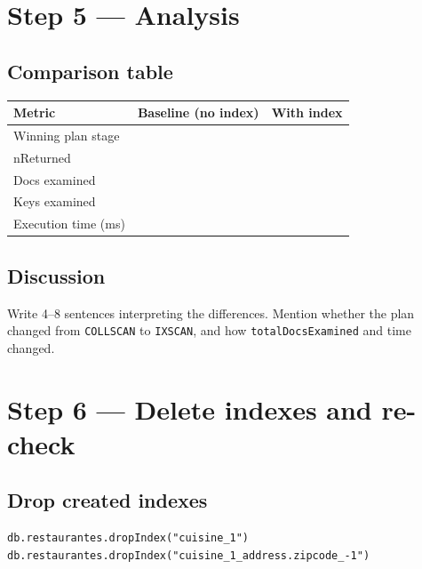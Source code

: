 \documentclass[11pt]{article}
\begin{document}
\section{Step 5 — Analysis}
\subsection{Comparison table}
\begin{tcolorbox}
\begin{tabular}{p{4.2cm}p{5.0cm}p{5.0cm}}
\textbf{Metric} & \textbf{Baseline (no index)} & \textbf{With index} \\
\hline
Winning plan stage & \underline{\hspace{4.5cm}} & \underline{\hspace{4.5cm}} \\
nReturned & \underline{\hspace{4.5cm}} & \underline{\hspace{4.5cm}} \\
Docs examined & \underline{\hspace{4.5cm}} & \underline{\hspace{4.5cm}} \\
Keys examined & \underline{\hspace{4.5cm}} & \underline{\hspace{4.5cm}} \\
Execution time (ms) & \underline{\hspace{4.5cm}} & \underline{\hspace{4.5cm}} \\
\end{tabular}
\end{tcolorbox}

\subsection{Discussion}
Write 4--8 sentences interpreting the differences. Mention whether the plan changed from
\texttt{COLLSCAN} to \texttt{IXSCAN}, and how \texttt{totalDocsExamined} and time changed.

\vspace{2.2cm}

\section{Step 6 — Delete indexes and re-check}
\subsection{Drop created indexes}
\begin{cmd}
\begin{verbatim}
db.restaurantes.dropIndex("cuisine_1")
db.restaurantes.dropIndex("cuisine_1_address.zipcode_-1")
\end{verbatim}
\end{cmd}
\end{document}
